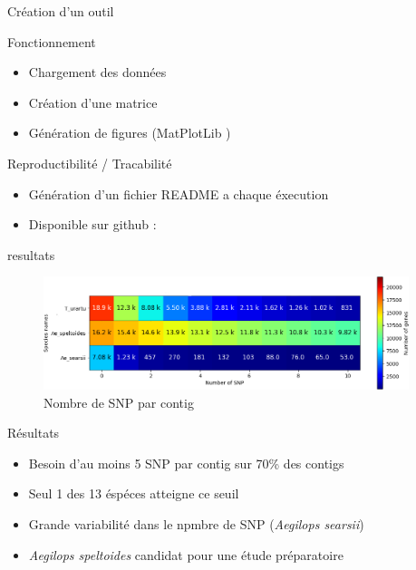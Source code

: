 \begin{frame}{Création d'un outil}
    \begin{block}{Fonctionnement}
        \begin{itemize}
            \item Chargement des données
            \item Création d'une matrice
            \item Génération de figures (MatPlotLib \cite{matplotlib})
        \end{itemize}
    \end{block}

    \begin{block}{Reproductibilité / Tracabilité}
        \begin{itemize}
            \item Génération d'un fichier README a chaque éxecution
            \item Disponible sur github : \cite{florent_f-marchalm1bioinfointernship2024-inrae_agap_ge2pop_2024}
        \end{itemize}
    \end{block}

    
\end{frame}

\begin{frame}{resultats}

    \begin{figure}[h!]
        \centering
        \includegraphics[width=0.95\textwidth]{Illustrations/Classic_results.png}
        \caption{Nombre de SNP par contig}
        \label{fig:heatmap_snp}
    \end{figure}

    \begin{alertblock}{Résultats}
        \begin{itemize}
            \small
            \item Besoin d'au moins 5 SNP par contig sur 70\% des contigs
            \item Seul 1 des 13 éspéces atteigne ce seuil
            \item Grande variabilité dans le npmbre de SNP (\textit{Aegilops searsii})
            \item \textit{Aegilops speltoides} candidat pour une étude préparatoire
        \end{itemize}
    \end{alertblock}

\end{frame}




